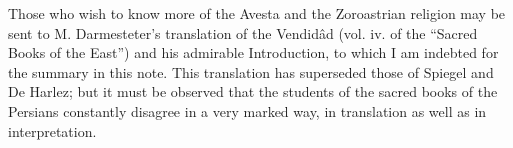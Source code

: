 Those who wish to know more of the Avesta and the Zoroastrian religion may be sent to M. Darmesteter\texthebrew{}’s translation of the Vendidâd (vol. iv. of the \texthebrew{“}Sacred Books of the East\texthebrew{}”) and his admirable Introduction, to which I am indebted for the summary in this note. This translation has superseded those of Spiegel and De Harlez; but it must be observed that the students of the sacred books of the Persians constantly disagree in a very marked way, in translation as well as in interpretation.
